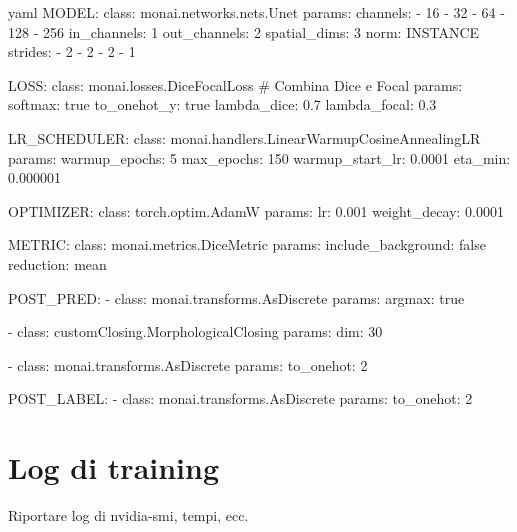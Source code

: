 \begin{code}{yaml}
MODEL:
  class: monai.networks.nets.Unet 
  params:
    channels:
      - 16
      - 32
      - 64
      - 128
      - 256
    in_channels: 1
    out_channels: 2
    spatial_dims: 3
    norm: INSTANCE
    strides:  
      - 2 
      - 2
      - 2
      - 1

LOSS:
  class: monai.losses.DiceFocalLoss  # Combina Dice e Focal
  params:
    softmax: true
    to_onehot_y: true
    lambda_dice: 0.7
    lambda_focal: 0.3

LR_SCHEDULER:
  class: monai.handlers.LinearWarmupCosineAnnealingLR
  params:
    warmup_epochs: 5
    max_epochs: 150
    warmup_start_lr: 0.0001
    eta_min: 0.000001

OPTIMIZER:
  class: torch.optim.AdamW
  params:
    lr: 0.001
    weight_decay: 0.0001  

METRIC:
  class: monai.metrics.DiceMetric
  params:
    include_background: false
    reduction: mean

POST_PRED:
  - class: monai.transforms.AsDiscrete
    params:
      argmax: true

  - class: customClosing.MorphologicalClosing
    params:
      dim: 30

  - class: monai.transforms.AsDiscrete
    params:
      to_onehot: 2

POST_LABEL:                                                                               
  - class: monai.transforms.AsDiscrete
    params:
      to_onehot: 2
    
\end{code}

\chapter{Log di training}
Riportare log di nvidia-smi, tempi, ecc.
